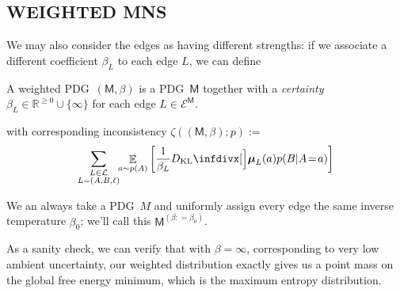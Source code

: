 \documentclass{article}
\def\sheq{\!=\!}
\newcommand{\bmu}{\boldsymbol{\mu}}
\newcommand{\Ed}{\mathcal E}
\newcommand{\sfM}{\mathsf M}
\newcommand{\MN}{PDG}
\newcommand{\MNs}{\MN s}
\numberwithin{equation}{section}
\begin{document}
\begin{notfocus}



	

		
	\section{WEIGHTED MNS}
	
	We may also consider the edges as having different strengths: if we associate a different coefficient $\beta_L$ to each edge $L$, we can define
	
	\begin{defn}
		A weighted \MN\ $(\sfM, \beta)$ is a \MN\ $\sfM$ together with a \emph{certainty} $\beta_L \in \mathbb R^{\geq 0} \cup \{\infty\}$ for each edge $L \in \Ed^\sfM$.
	\end{defn}
	
	with corresponding inconsistency $\zeta((\sfM, \beta) ; p) :=$
	\[
	\sum_{\substack{L \in \cal L\\L = (A,B, \ell)}}\!\! \mathop{\mathbb E}_{a \sim p(A)} \left[\frac{1}{\beta_L}\kldiv[\Big]{\bmu_{L}(a) }{ p(B | A \sheq a) } \right]
	\]
	
	We an always take a \MN\ $M$ and uniformly assign every edge the same inverse temperature $\beta_0$; we'll call this $\sfM^{(\beta\colon\!=\beta_0)}$.
	
	As a sanity check, we can verify that with $\beta = \infty$, corresponding to very low ambient uncertainty, our weighted distribution exactly gives us a point mass on the global free energy minimum, which is the maximum entropy distribution.
	

\end{notfocus}
\end{document}
